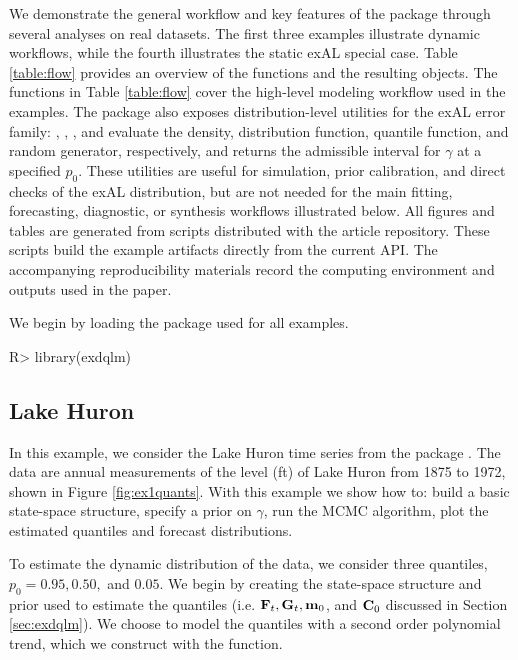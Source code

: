 \documentclass[jss]{jss}
\begin{document}
We demonstrate the general workflow and key features of the package through several analyses on real datasets. The first three examples illustrate dynamic workflows, while the fourth illustrates the static exAL special case. Table \ref{table:flow} provides an overview of the  functions and the resulting objects. The functions in Table \ref{table:flow} cover the high-level modeling workflow used in the examples. The package also exposes distribution-level utilities for the exAL error family: , , , and  evaluate the density, distribution function, quantile function, and random generator, respectively, and  returns the admissible interval for $\gamma$ at a specified $p_0$. These utilities are useful for simulation, prior calibration, and direct checks of the exAL distribution, but are not needed for the main fitting, forecasting, diagnostic, or synthesis workflows illustrated below. All figures and tables are generated from scripts distributed with the article repository. These scripts build the example artifacts directly from the current  API. The accompanying reproducibility materials record the computing environment and outputs used in the paper.

We begin by loading the  package used for all examples.

\begin{CodeChunk}
\begin{CodeInput}
R> library(exdqlm)
\end{CodeInput}
\end{CodeChunk}


\subsection{Lake Huron}
\label{sec:ex1}

In this example, we consider the Lake Huron time series from the package . The data are annual measurements of the level (ft) of Lake Huron from 1875 to 1972, shown in Figure \ref{fig:ex1quants}. With this example we show how to: build a basic state-space structure, specify a prior on $\gamma$, run the MCMC algorithm, plot the estimated quantiles and forecast distributions.

To estimate the dynamic distribution of the data, we consider three quantiles, $p_0=0.95,0.50,$ and $0.05$. We begin by creating the state-space structure and prior used to estimate the quantiles (i.e. ${\bf F}_t,{\bf G}_t, {\bf m}_0$, and ${\bf C}_0$ discussed in Section \ref{sec:exdqlm}). We choose to model the quantiles with a second order polynomial trend, which we construct with the  function.
\end{document}
